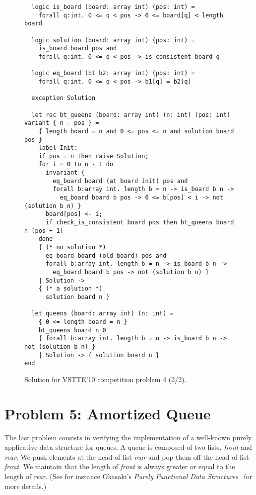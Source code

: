 \begin{figure}
  \centering
\begin{verbatim}
  logic is_board (board: array int) (pos: int) =
    forall q:int. 0 <= q < pos -> 0 <= board[q] < length board

  logic solution (board: array int) (pos: int) =
    is_board board pos and
    forall q:int. 0 <= q < pos -> is_consistent board q

  logic eq_board (b1 b2: array int) (pos: int) =
    forall q:int. 0 <= q < pos -> b1[q] = b2[q]

  exception Solution

  let rec bt_queens (board: array int) (n: int) (pos: int) variant { n - pos } =
    { length board = n and 0 <= pos <= n and solution board pos }
    label Init:
    if pos = n then raise Solution;
    for i = 0 to n - 1 do
      invariant {
        eq_board board (at board Init) pos and
        forall b:array int. length b = n -> is_board b n ->
          eq_board board b pos -> 0 <= b[pos] < i -> not (solution b n) }
      board[pos] <- i;
      if check_is_consistent board pos then bt_queens board n (pos + 1)
    done
    { (* no solution *)
      eq_board board (old board) pos and
      forall b:array int. length b = n -> is_board b n ->
        eq_board board b pos -> not (solution b n) }
    | Solution ->
    { (* a solution *)
      solution board n }

  let queens (board: array int) (n: int) =
    { 0 <= length board = n }
    bt_queens board n 0
    { forall b:array int. length b = n -> is_board b n -> not (solution b n) }
    | Solution -> { solution board n }
end
\end{verbatim}
\vspace*{-2em}\hrulefill
  \caption{Solution for VSTTE'10 competition problem 4 (2/2).}
  \label{fig:NQueens2}
\end{figure}


\section{Problem 5: Amortized Queue}

The last problem consists in verifying the implementation of a
well-known purely applicative data structure for queues.
A queue is composed of two lists, \textit{front} and \textit{rear}.
We push elements at the head of list \textit{rear} and pop them off
the head of list \textit{front}. We maintain that the length of
\textit{front} is always greater or equal to the length of \textit{rear}.
(See for instance Okasaki's \emph{Purely Functional Data
  Structures}~\cite{okasaki98} for more details.)

